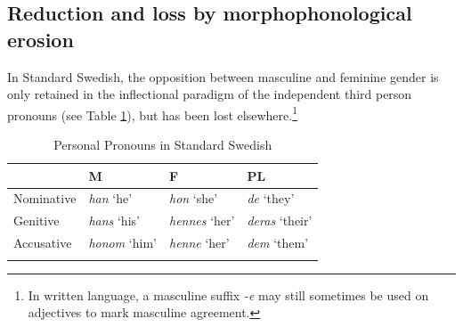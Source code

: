 \documentclass[output=collectionpaper]{langsci/langscibook}
\begin{document}
\subsection{Reduction and loss by morphophonological erosion}
\label{subsubsec:deflection}
In Standard Swedish, the opposition between masculine and feminine gender is only retained in the inflectional paradigm of the independent third person pronouns (see Table \ref{tab:3:Swedish}), but has been lost elsewhere.\footnote{In written language, a masculine suffix \textit{-e} may still sometimes be used on adjectives to mark masculine agreement.}

 \begin{table}
\caption{Personal Pronouns in Standard Swedish}
\label{tab:3:Swedish}
 \begin{tabular}{llll} %
  \lsptoprule
&  M    & F & PL \\ %
  \midrule
Nominative & \textit{han} `he' & \textit{hon} `she' & \textit{de} `they'\\
Genitive & \textit{hans} `his' &  \textit{hennes} `her' & \textit{deras} `their'\\
Accusative &\textit{honom} `him'  & \textit{henne} `her' & \textit{dem} `them'\\
  \lspbottomrule
 \end{tabular}
\end{table}
\end{document}
